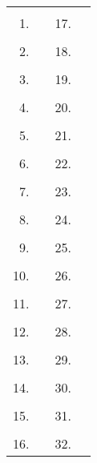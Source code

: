 \begin{tabularx}{\textwidth}{|r X|r X|}
\hline
& & & \\[-.8em]  1. & & 17. & \\[.4em] \hline
& & & \\[-.8em]  2. & & 18. & \\[.4em] \hline
& & & \\[-.8em]  3. & & 19. & \\[.4em] \hline
& & & \\[-.8em]  4. & & 20. & \\[.4em] \hline
& & & \\[-.8em]  5. & & 21. & \\[.4em] \hline
& & & \\[-.8em]  6. & & 22. & \\[.4em] \hline
& & & \\[-.8em]  7. & & 23. & \\[.4em] \hline
& & & \\[-.8em]  8. & & 24. & \\[.4em] \hline
& & & \\[-.8em]  9. & & 25. & \\[.4em] \hline
& & & \\[-.8em] 10. & & 26. & \\[.4em] \hline
& & & \\[-.8em] 11. & & 27. & \\[.4em] \hline
& & & \\[-.8em] 12. & & 28. & \\[.4em] \hline
& & & \\[-.8em] 13. & & 29. & \\[.4em] \hline
& & & \\[-.8em] 14. & & 30. & \\[.4em] \hline
& & & \\[-.8em] 15. & & 31. & \\[.4em] \hline
& & & \\[-.8em] 16. & & 32. & \\[.4em] \hline
\end{tabularx}
